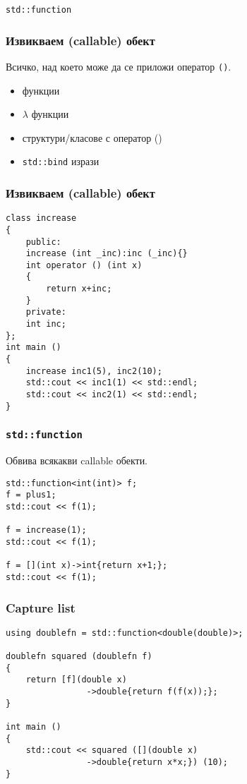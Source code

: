\documentclass{beamer}
\begin{document}
\begin{frame}
    \centerline{\texttt{std::function}}
\end{frame}


\begin{frame}[fragile]
\frametitle{Извикваем (callable) обект}

Всичко, над което може да се приложи оператор \texttt{()}.

\begin{itemize}
    \item функции
    \item $\lambda$ функции
    \item структури/класове с оператор ()
    \item \texttt{std::bind} изрази
\end{itemize}

\end{frame}

\begin{frame}[fragile]
    \frametitle{Извикваем (callable) обект}

\begin{lstlisting}[basicstyle=\small]
class increase
{
    public:
    increase (int _inc):inc (_inc){}
    int operator () (int x)
    {
        return x+inc;
    }
    private:
    int inc;
};
int main ()
{
    increase inc1(5), inc2(10);
    std::cout << inc1(1) << std::endl;
    std::cout << inc2(1) << std::endl;
}    
\end{lstlisting}    
\end{frame}
    

\begin{frame}[fragile]
    \frametitle{\texttt{std::function}}

Обвива всякакви callable обекти.
\bigskip

\begin{lstlisting}[basicstyle=\small]
std::function<int(int)> f;
f = plus1; 
std::cout << f(1);

f = increase(1); 
std::cout << f(1);

f = [](int x)->int{return x+1;}; 
std::cout << f(1);
\end{lstlisting}    
\end{frame}



\begin{frame}[fragile]
    \frametitle{Capture list}
    
\begin{lstlisting}[basicstyle=\small]
using doublefn = std::function<double(double)>;

doublefn squared (doublefn f)
{ 
    return [f](double x)
                ->double{return f(f(x));};
}

int main ()
{
    std::cout << squared ([](double x)
                ->double{return x*x;}) (10);
}
\end{lstlisting}
\end{frame}
\end{document}
